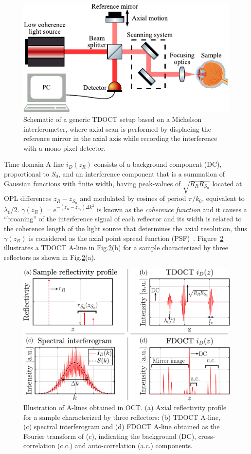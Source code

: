 \begin{figure}[htb!]
    \centering
    \includegraphics[width=.7\textwidth]{Figures/TheoreticalBasis/TDOCT_Scheme.pdf}
    \caption[Schematic of a generic TDOCT setup based on a Michelson interferometer.]{Schematic of a generic TDOCT setup based on a Michelson interferometer, where axial scan is performed by displacing the reference mirror in the axial axis while recording the interference with a mono-pixel detector.}
    \label{fig:TDOCT_Scheme}
\end{figure}

Time domain A-line $i_D(z_R)$ consists of a background component (DC), proportional to $S_0$, and an interference component that is a summation of Gaussian functions with finite width, having peak-values of $\sqrt{R_RR_{S_n}}$ located at OPL differences $z_R-z_{S_n}$ and modulated by cosines of period $\pi/k_0$, equivalent to $\lambda_0/2$. $\gamma(z_R)=e^{-(z_R-z_{S_n})\Delta k^2}$ is known as the \textit{coherence function} and it causes a ``broaning'' of the interference signal of each reflector and its width is related to the coherence length of the light source that determines the axial resolution, thus $\gamma(z_R)$ is considered as the axial point spread function (PSF)~\cite{Izatt2015_Theory}. Figure~\ref{fig:Alines} illustrates a TDOCT A-line in Fig.\ref{fig:Alines}(b) for a sample characterized by three reflectors as shown in Fig.\ref{fig:Alines}(a).

\begin{figure}[htb!]
    \centering
    \includegraphics[width=.7\textwidth]{Figures/TheoreticalBasis/Alines.pdf}
    \caption[Illustration of A-lines obtained in OCT.]{Illustration of A-lines obtained in OCT. (a) Axial reflectivity profile for a sample characterized by three reflectors: (b) TDOCT A-line, (c) spectral interferogram and (d) FDOCT A-line obtained as the Fourier transform of (c), indicating the background (DC), cross-correlation (c.c.) and auto-correlation (a.c.) components.}
    \label{fig:Alines}
\end{figure}

